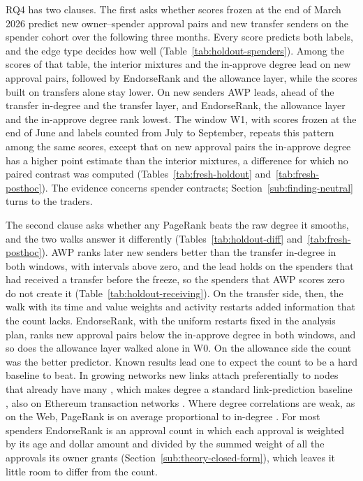 RQ4 has two clauses. The first asks whether scores frozen at the end of March 2026 predict new owner--spender approval pairs and new transfer senders on the spender cohort over the following three months. Every score predicts both labels, and the edge type decides how well (Table~\ref{tab:holdout-spenders}). Among the scores of that table, the interior mixtures and the in-approve degree lead on new approval pairs, followed by EndorseRank and the allowance layer, while the scores built on transfers alone stay lower. On new senders AWP leads, ahead of the transfer in-degree and the transfer layer, and EndorseRank, the allowance layer and the in-approve degree rank lowest. The window W1, with scores frozen at the end of June and labels counted from July to September, repeats this pattern among the same scores, except that on new approval pairs the in-approve degree has a higher point estimate than the interior mixtures, a difference for which no paired contrast was computed (Tables~\ref{tab:fresh-holdout} and~\ref{tab:fresh-posthoc}). The evidence concerns spender contracts; Section~\ref{sub:finding-neutral} turns to the traders.

The second clause asks whether any PageRank beats the raw degree it smooths, and the two walks answer it differently (Tables~\ref{tab:holdout-diff} and~\ref{tab:fresh-posthoc}). AWP ranks later new senders better than the transfer in-degree in both windows, with intervals above zero, and the lead holds on the spenders that had received a transfer before the freeze, so the spenders that AWP scores zero do not create it (Table~\ref{tab:holdout-receiving}). On the transfer side, then, the walk with its time and value weights and activity restarts added information that the count lacks. EndorseRank, with the uniform restarts fixed in the analysis plan, ranks new approval pairs below the in-approve degree in both windows, and so does the allowance layer walked alone in W0. On the allowance side the count was the better predictor. Known results lead one to expect the count to be a hard baseline to beat. In growing networks new links attach preferentially to nodes that already have many \parencite{barabasi1999scaling}, which makes degree a standard link-prediction baseline \parencite{libennowell2007link}, also on Ethereum transaction networks \parencite{lin2022tracking}. Where degree correlations are weak, as on the Web, PageRank is on average proportional to in-degree \parencite{fortunato2008indegree}. For most spenders EndorseRank is an approval count in which each approval is weighted by its age and dollar amount and divided by the summed weight of all the approvals its owner grants (Section~\ref{sub:theory-closed-form}), which leaves it little room to differ from the count.

